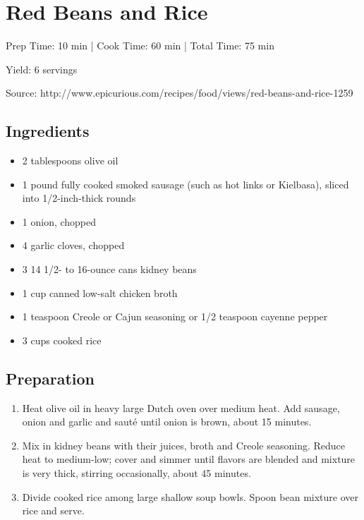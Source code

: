 \section{Red Beans and Rice}

\begin{center}
Prep Time: 10 min |
Cook Time: 60 min |
Total Time: 75 min

\noindent Yield: 6 servings

\vspace{1em}

Source: http://www.epicurious.com/recipes/food/views/red-beans-and-rice-1259
\end{center}

\subsection{Ingredients}
\begin{multicols}{2}
\begin{itemize}
    \item 2 tablespoons olive oil
    \item 1 pound fully cooked smoked sausage (such as hot links or Kielbasa), sliced into 1/2-inch-thick rounds
    \item 1 onion, chopped
    \item 4 garlic cloves, chopped
    \item 3 14 1/2- to 16-ounce cans kidney beans
    \item 1 cup canned low-salt chicken broth
    \item 1 teaspoon Creole or Cajun seasoning or 1/2 teaspoon cayenne pepper
    \item 3 cups cooked rice
\end{itemize}
\end{multicols}

\subsection{Preparation}
\begin{enumerate}
    \item Heat olive oil in heavy large Dutch oven over medium heat. Add sausage, onion and garlic and sauté until onion is brown, about 15 minutes.
    \item Mix in kidney beans with their juices, broth and Creole seasoning. Reduce heat to medium-low; cover and simmer until flavors are blended and mixture is very thick, stirring occasionally, about 45 minutes.
    \item Divide cooked rice among large shallow soup bowls. Spoon bean mixture over rice and serve.
\end{enumerate}
